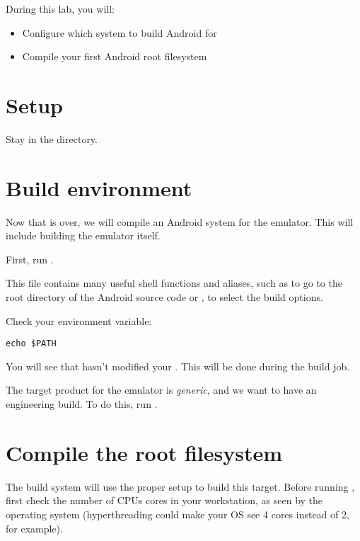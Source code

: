 
During this lab, you will:
\begin{itemize}
  \item Configure which system to build Android for
  \item Compile your first Android root filesystem
\end{itemize}

\section{Setup}

Stay in the  directory.

\section{Build environment}

Now that  is over, we will compile an Android system for the
emulator. This will include building the emulator itself.

First, run .

This file contains many useful shell functions and aliases, such as  to
go to the root directory of the Android source code or , to select
the build options.

Check your  environment variable:

\begin{verbatim}
echo $PATH
\end{verbatim}

You will see that   hasn't modified your .
This will be done during the build job.

The target product for the emulator is {\it generic}, and we want to have an 
engineering build. To do this, run .

\section{Compile the root filesystem}

The build system will use the proper setup to build this target. Before running
, first check the number of CPUs cores in your workstation, as seen by
the operating system (hyperthreading could make your OS see 4 cores instead of 2,
for example).

